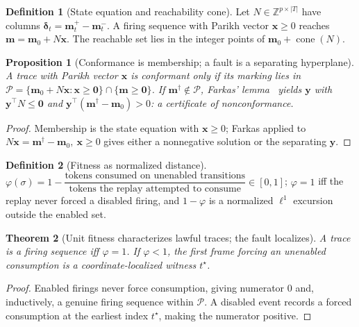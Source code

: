 \documentclass[11pt,oneside]{book}
\theoremstyle{definition}
\newtheorem{definition}{Definition}[chapter]
\theoremstyle{plain}
\newtheorem{theorem}{Theorem}[chapter]
\newtheorem{proposition}[theorem]{Proposition}
\theoremstyle{remark}
\newcommand{\Fitness}{\varphi}
\begin{document}
\begin{definition}[State equation and reachability cone]\label{def:reachcone}
Let $N\in\mathbb Z^{p\times|T|}$ have columns $\bm\delta_t=\bm m^+_t-\bm m^-_t$. A firing
sequence with Parikh vector $\bm x\ge0$ reaches $\bm m=\bm m_0+N\bm x$. The reachable set lies
in the integer points of $\bm m_0+\operatorname{cone}(N)$.
\end{definition}

\begin{proposition}[Conformance is membership; a fault is a separating hyperplane]\label{prop:conformembership}
A trace with Parikh vector $\bm x$ is conformant only if its marking lies in
$\mathcal P=\{\bm m_0+N\bm x:\bm x\ge\bm0\}\cap\{\bm m\ge\bm0\}$. If $\bm m^\dagger\notin\mathcal P$,
Farkas' lemma~\cite{schrijver1986} yields $\bm y$ with $\bm y^\top N\le\bm0$ and $\bm y^\top(\bm m^\dagger-\bm m_0)>0$:
a certificate of nonconformance.
\end{proposition}

\begin{proof}
Membership is the state equation with $\bm x\ge0$; Farkas applied to $N\bm x=\bm m^\dagger-
\bm m_0,\ \bm x\ge0$ gives either a nonnegative solution or the separating $\bm y$. \end{proof}

\begin{definition}[Fitness as normalized distance]\label{def:fitnessdistance}
$\Fitness(\sigma)=1-\dfrac{\text{tokens consumed on unenabled transitions}}{\text{tokens the
replay attempted to consume}}\in[0,1]$; $\Fitness=1$ iff the replay never forced a disabled
firing, and $1-\Fitness$ is a normalized $\ell^1$ excursion outside the enabled set.
\end{definition}

\begin{theorem}[Unit fitness characterizes lawful traces; the fault localizes]\label{thm:unitfitness}
A trace is a firing sequence iff $\Fitness=1$. If $\Fitness<1$, the first frame forcing an
unenabled consumption is a coordinate-localized witness $t^\star$.
\end{theorem}

\begin{proof}
Enabled firings never force consumption, giving numerator $0$ and, inductively, a genuine
firing sequence within $\mathcal P$. A disabled event records a forced consumption at the
earliest index $t^\star$, making the numerator positive. \end{proof}
\end{document}
